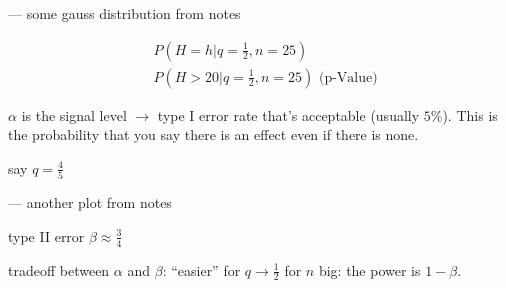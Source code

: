 \documentclass[../main/Notes.tex]{subfiles}
\begin{document}
--- some gauss distribution from notes

\begin{align*}
&P\left(H=h |q=\frac{1}{2},n=25\right) \\
&P\left(H>20 |q=\frac{1}{2},n=25\right) \mbox{ (p-Value)}
\end{align*}

$\alpha$ is the signal level $\rightarrow$ type I error rate that's acceptable (usually $5\%$). This is the probability that you say there is an effect even if there is none.

say $q = \frac{4}{5}$

--- another plot from notes

type II error $\beta \approx \frac{3}{4}$

tradeoff between $\alpha$ and $\beta$: ``easier'' for $q \rightarrow \frac{1}{2}$ for $n$ big: the power is $1-\beta$.
\end{document}
